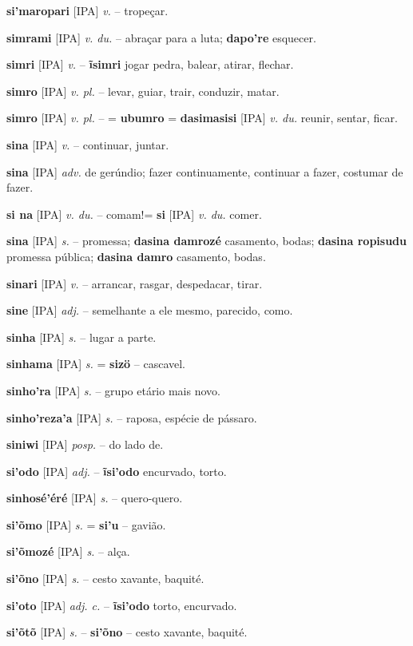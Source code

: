 \textbf{si'maropari} [IPA] \textit{v.} -- tropeçar.

\textbf{simrami} [IPA] \textit{v. du.} -- abraçar para a luta; \textbf{dapo're} esquecer.

\textbf{simri} [IPA] \textit{v.} -- \textbf{ĩsimri} jogar pedra, balear, atirar, flechar.

\textbf{simro} [IPA] \textit{v. pl.} -- levar, guiar, trair, conduzir, matar.

\textbf{simro} [IPA] \textit{v. pl.} -- = \textbf{ubumro} = \textbf{dasimasisi} [IPA] \textit{v. du.} reunir, sentar, ficar.

\textbf{sina} [IPA] \textit{v.} -- continuar, juntar.

\textbf{sina} [IPA] \textit{adv.} de gerúndio; fazer continuamente, continuar a fazer, costumar de fazer.

\textbf{si na} [IPA] \textit{v. du.} -- comam!= \textbf{si} [IPA] \textit{v. du.} comer.

\textbf{sina} [IPA] \textit{s.} -- promessa; \textbf{dasina damrozé} casamento, bodas; \textbf{dasina ropisudu} promessa pública; \textbf{dasina damro} casamento, bodas.

\textbf{sinari} [IPA] \textit{v.} -- arrancar, rasgar, despedacar, tirar.

\textbf{sine} [IPA] \textit{adj.} -- semelhante a ele mesmo, parecido, como.

\textbf{sinha} [IPA] \textit{s.} -- lugar a parte.

\textbf{sinhama} [IPA] \textit{s.} = \textbf{sizö} -- cascavel.

\textbf{sinho'ra} [IPA] \textit{s.} -- grupo etário mais novo.

\textbf{sinho'reza'a} [IPA] \textit{s.} -- raposa, espécie de pássaro.

\textbf{siniwi} [IPA] \textit{posp.} -- do lado de.

\textbf{si'odo} [IPA] \textit{adj.} -- \textbf{ĩsi'odo} encurvado, torto.

\textbf{sinhosé'éré} [IPA] \textit{s.} -- quero-quero.

\textbf{si'õmo} [IPA] \textit{s.} = \textbf{si'u} -- gavião.

\textbf{si'õmozé} [IPA] \textit{s.} -- alça.

\textbf{si'õno} [IPA] \textit{s.} -- cesto xavante, baquité.

\textbf{si'oto} [IPA] \textit{adj. c.} -- \textbf{ĩsi'odo} torto, encurvado.

\textbf{si'õtõ} [IPA] \textit{s.} -- \textbf{si'õno} -- cesto xavante, baquité.


